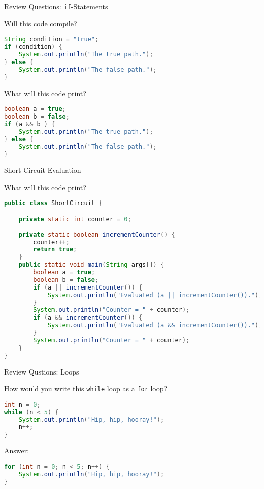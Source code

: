 \documentclass{beamer}
\begin{document}
\begin{frame}[fragile]{Review Questions: {\tt if}-Statements}


Will this code compile?
\vspace{-.1in}
\begin{lstlisting}[language=Java]
String condition = "true";
if (condition) {
    System.out.println("The true path.");
} else {
    System.out.println("The false path.");
}
\end{lstlisting}

What will this code print?
\begin{lstlisting}[language=Java]
boolean a = true;
boolean b = false;
if (a && b ) {
    System.out.println("The true path.");
} else {
    System.out.println("The false path.");
}
\end{lstlisting}

\end{frame}

\begin{frame}[fragile]{Short-Circuit Evaluation}


What will this code print?
\vspace{-.1in}
\begin{lstlisting}[language=Java]
public class ShortCircuit {

    private static int counter = 0;
    
    private static boolean incrementCounter() {
        counter++;
        return true;
    }
    public static void main(String args[]) {
        boolean a = true;
        boolean b = false;
        if (a || incrementCounter()) {
            System.out.println("Evaluated (a || incrementCounter()).");
        }
        System.out.println("Counter = " + counter);
        if (a && incrementCounter()) {
            System.out.println("Evaluated (a && incrementCounter()).");
        }
        System.out.println("Counter = " + counter);
    }
}
\end{lstlisting}


\end{frame}

\begin{frame}[fragile]{Review Qustions: Loops}


How would you write this {\tt while} loop as a {\tt for} loop?
\begin{lstlisting}[language=Java]
int n = 0;
while (n < 5) {
    System.out.println("Hip, hip, hooray!");
    n++;
}
\end{lstlisting}

Answer:
\begin{lstlisting}[language=Java]
for (int n = 0; n < 5; n++) {
    System.out.println("Hip, hip, hooray!");
}
\end{lstlisting}


\end{frame}
\end{document}
